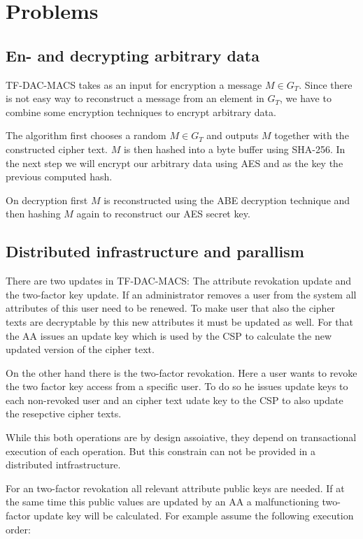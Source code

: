 \section{Problems}

\subsection{En- and decrypting arbitrary data}
TF-DAC-MACS takes as an input for encryption a message $M \in G_T$. Since there is not easy way to reconstruct a message from an element in $G_T$, we have to combine some encryption techniques to encrypt arbitrary data. 

The algorithm first chooses a random $M \in G_T$ and outputs $M$ together with the constructed cipher text. $M$ is then hashed into a byte buffer using \ac{SHA}-256. In the next step we will encrypt our arbitrary data using \ac{AES} and as the key the previous computed hash. 

On decryption first $M$ is reconstructed using the ABE decryption technique and then hashing $M$ again to reconstruct our AES secret key.


\subsection{Distributed infrastructure and parallism}

There are two updates in TF-DAC-MACS: The attribute revokation update and the two-factor key update. If an administrator removes a user from the system all attributes of this user need to be renewed. To make user that also the cipher texts are decryptable by this new attributes it must be updated as well. For that the AA issues an update key which is used by the CSP to calculate the new updated version of the cipher text. 

On the other hand there is the two-factor revokation. Here a user wants to revoke the two factor key access from a specific user. To do so he issues update keys to each non-revoked user and an cipher text udate key to the CSP to also update the resepctive cipher texts.

While this both operations are by design assoiative, they depend on transactional execution of each operation. But this constrain can not be provided in a distributed intfrastructure. 

For an two-factor revokation all relevant attribute public keys are needed. If at the same time this public values are updated by an AA a malfunctioning two-factor update key will be calculated. For example assume the following execution order:

